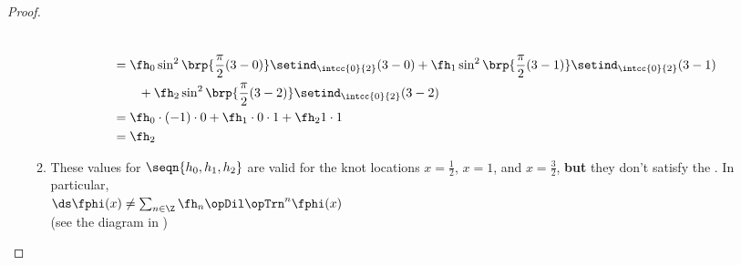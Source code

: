 \begin{proof}
\begin{enumerate}
\begin{enumerate}
\begin{align*}
          \\&=\fh_0 \sin^2\brp{\frac{\pi}{2}(3-0)}\setind_\intcc{0}{2}(3-0)
             +\fh_1 \sin^2\brp{\frac{\pi}{2}(3-1)}\setind_\intcc{0}{2}(3-1)
             \\&\qquad+\fh_2 \sin^2\brp{\frac{\pi}{2}(3-2)}\setind_\intcc{0}{2}(3-2)
          \\&=\fh_0 \cdot(-1)\cdot0
             +\fh_1 \cdot0\cdot1
             +\fh_2 1\cdot1
          \\&=\fh_2
        \end{align*}
      \item These values for $\seqn{h_0,h_1,h_2}$ are valid for the knot locations $x=\frac{1}{2}$, $x=1$, and $x=\frac{3}{2}$,
            \textbf{but} they don't satisfy the  . In particular,
            \\\indentx$\ds\fphi(x) \neq \sum_{n\in\Z}\fh_n \opDil\opTrn^n \fphi(x)$
            \\(see the diagram in )
    \end{enumerate}
\end{enumerate}
\end{proof}



